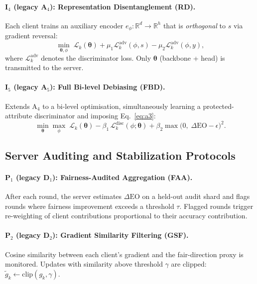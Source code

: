 ﻿\documentclass{article}
\newcommand{\calL}{\mathcal{L}}
\newcommand{\RR}{\mathbb{R}}
\newcommand{\params}{\boldsymbol{\theta}}%
\newcommand{\DEOpp}{\Delta\mathrm{EO}}   %
\begin{document}
\paragraph{I$_4$ (legacy A$_4$): Representation Disentanglement (RD).}
Each client trains an auxiliary encoder
$e_{\phi}: \RR^d \to \RR^h$ that is \emph{orthogonal} to $s$
via gradient reversal:
\begin{equation}
  \min_{\params,\phi}\;\calL_k(\params)
  + \mu_1 \calL_k^{\text{adv}}(\phi, s)
  - \mu_2 \calL_k^{\text{adv}}(\phi, y),
  \label{eq:a4}
\end{equation}
where $\calL_k^{\text{adv}}$ denotes the discriminator loss.
Only $\params$ (backbone + head) is transmitted to the server.

\paragraph{I$_5$ (legacy A$_5$): Full Bi-level Debiasing (FBD).}
Extends A$_4$ to a bi-level optimisation, simultaneously learning a
protected-attribute discriminator and imposing Eq.~\eqref{eq:a3}:
\begin{equation}
  \min_{\params}\max_{\phi}\;
  \calL_k(\params) - \beta_1\,\calL_k^{\text{disc}}(\phi;\params)
  + \beta_2\max\!\bigl(0,\;\DEOpp - \epsilon\bigr)^2.
  \label{eq:a5}
\end{equation}

\subsection{Server Auditing and Stabilization Protocols}
\label{sec:defenses}

\paragraph{P$_1$ (legacy D$_1$): Fairness-Audited Aggregation (FAA).}
After each round, the server estimates $\DEOpp$ on a held-out audit
shard and flags rounds where fairness improvement exceeds a threshold
$\tau$. Flagged rounds trigger re-weighting of client contributions
proportional to their accuracy contribution.

\paragraph{P$_2$ (legacy D$_2$): Gradient Similarity Filtering (GSF).}
Cosine similarity between each client's gradient and the fair-direction
proxy is monitored.
Updates with similarity above threshold $\gamma$ are clipped:
$\tilde{g}_k \leftarrow \mathrm{clip}(g_k, \gamma)$.
\end{document}
